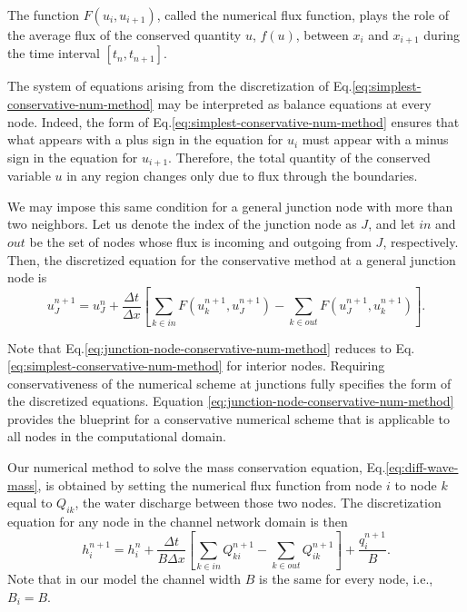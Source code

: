 \documentclass[bg, manuscript]{copernicus}
\begin{document}
The function $F(u_i, u_{i+1})$, called the numerical flux function, plays the role of the average   flux of the conserved quantity $u$, $f(u)$, between $x_i$ and $x_{i+1}$ during the time interval $[t_n, t_{n+1}]$.

The system of equations arising from the discretization of Eq.\eqref{eq:simplest-conservative-num-method} may be interpreted as balance equations at every node.
Indeed, the form of Eq.\eqref{eq:simplest-conservative-num-method} ensures that what appears with a plus sign in the equation for $u_i$  must appear with a minus sign in the equation for $u_{i+1}$.
Therefore, the total quantity of the conserved variable $u$ in any region changes only due to flux through the boundaries.

We may impose this same condition for a general junction node with more than two neighbors.
Let us denote the index of the junction node as $J$, and let $in$ and $out$ be the set of nodes whose flux is incoming and outgoing from $J$, respectively.
Then, the discretized equation for the conservative method at a general junction node is
\begin{equation}
    \label{eq:junction-node-conservative-num-method}
    u^{n+1}_J = u^{n}_J + \frac{\Delta t}{\Delta x}\left[ \sum_{k\in in}F\left(u^{n+1}_k, u^{n+1}_J\right) - \sum_{k\in out}F\left(u^{n+1}_J, u^{n+1}_k\right) \right].
\end{equation}

Note that Eq.\eqref{eq:junction-node-conservative-num-method} reduces to Eq.\eqref{eq:simplest-conservative-num-method} for interior nodes.
Requiring conservativeness of the numerical scheme at junctions fully specifies the form of the discretized equations.   
Equation \eqref{eq:junction-node-conservative-num-method} provides the blueprint for a conservative numerical scheme  that is applicable to all nodes in the computational domain.

Our numerical method to solve the mass conservation equation, Eq.\eqref{eq:diff-wave-mass}, is obtained by setting the numerical flux function from node $i$ to node $k$ equal to $Q_{ik}$, the water discharge between those two nodes.
The discretization equation for any node in the channel network domain is then
\begin{equation} \label{eq:mass-consv-discretization}
h_i^{n+1} = h_i^{n} + \frac{\Delta t}{B\Delta x }\left[ \sum_{k\in in} Q_{ki}^{n+1} - \sum_{k \in out}Q_{ik}^{n+1}\right] + \frac{q_i^{n+1}}{B}.
\end{equation}
Note that in our model the channel width $B$ is the same for every node, i.e., $B_i = B$.
\end{document}
